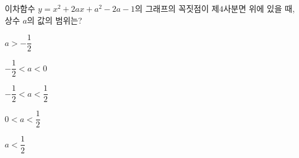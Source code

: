 이차함수 $y=x^2+2ax+a^2-2a-1$의 그래프의 꼭짓점이 제$4$사분면 위에 있을 때, 상수 $a$의 값의 범위는?
\begin{choices32}{\rule[-3ex]{0pt}{8ex}$a>-\dfrac{1}{2}$}{\rule[-3ex]{0pt}{8ex}$-\dfrac{1}{2}<a<0$}{\rule[-3ex]{0pt}{8ex}$-\dfrac{1}{2}<a<\dfrac{1}{2}$}{\rule[-3ex]{0pt}{8ex}$0<a<\dfrac{1}{2}$}{\rule[-3ex]{0pt}{8ex}$a<\dfrac{1}{2}$}\end{choices32}
